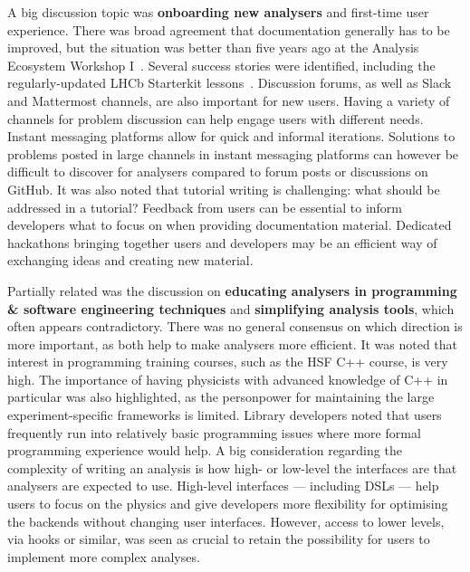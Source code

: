 \documentclass[a4paper,11pt]{article}
\begin{document}
A big discussion topic was \textbf{onboarding new analysers} and
first-time user experience. There was broad agreement that documentation
generally has to be improved, but the situation was better than five
years ago at the Analysis Ecosystem
Workshop I~\cite{elmer_peter_2017_6599290}. Several success stories were identified, including the
regularly-updated LHCb Starterkit lessons~\cite{lhcb-starterkit}.
Discussion forums, as well as Slack and Mattermost
channels, are also important for new users. Having a variety of channels
for problem discussion can help engage users with different needs.
Instant messaging platforms allow for quick and informal iterations.
Solutions to problems posted in large channels in instant messaging
platforms can however be difficult to discover for analysers compared to
forum posts or discussions on GitHub. It was also noted that tutorial
writing is challenging: what should be addressed in a tutorial? Feedback
from users can be essential to inform developers what to focus on when
providing documentation material. Dedicated hackathons bringing together
users and developers may be an efficient way of exchanging ideas and
creating new material.

Partially related was the discussion on \textbf{educating analysers in
programming \& software engineering techniques} and \textbf{simplifying
analysis tools}, which often appears contradictory. There was no general
consensus on which direction is more important, as both help to make
analysers more efficient. It was noted that interest in programming
training courses, such as the HSF C++ course, is very high. The
importance of having physicists with advanced knowledge of C++ in
particular was also highlighted, as the personpower for maintaining the
large experiment-specific frameworks is limited. Library developers
noted that users frequently run into relatively basic programming issues
where more formal programming experience would help. A big consideration
regarding the complexity of writing an analysis is how high- or
low-level the interfaces are that analysers are expected to use.
High-level interfaces --- including DSLs --- help users to focus on the
physics and give developers more flexibility for optimising the backends
without changing user interfaces. However, access to lower levels, via
hooks or similar, was seen as crucial to retain the possibility for
users to implement more complex analyses.
\end{document}
